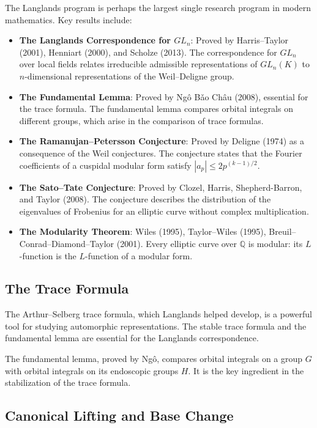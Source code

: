 The Langlands program is perhaps the largest single research program in modern mathematics. Key results include:
\begin{itemize}
\item \textbf{The Langlands Correspondence for $GL_n$}: Proved by Harris--Taylor (2001), Henniart (2000), and Scholze (2013). The correspondence for $GL_n$ over local fields relates irreducible admissible representations of $GL_n(K)$ to $n$-dimensional representations of the Weil--Deligne group.
\item \textbf{The Fundamental Lemma}: Proved by Ng\^o B\v{a}o Ch\^au (2008), essential for the trace formula. The fundamental lemma compares orbital integrals on different groups, which arise in the comparison of trace formulas.
\item \textbf{The Ramanujan--Petersson Conjecture}: Proved by Deligne (1974) as a consequence of the Weil conjectures. The conjecture states that the Fourier coefficients of a cuspidal modular form satisfy $|a_p| \leq 2p^{(k-1)/2}$.
\item \textbf{The Sato--Tate Conjecture}: Proved by Clozel, Harris, Shepherd-Barron, and Taylor (2008). The conjecture describes the distribution of the eigenvalues of Frobenius for an elliptic curve without complex multiplication.
\item \textbf{The Modularity Theorem}: Wiles (1995), Taylor--Wiles (1995), Breuil--Conrad--Diamond--Taylor (2001). Every elliptic curve over $\mathbb{Q}$ is modular: its $L$-function is the $L$-function of a modular form.
\end{itemize}

\subsection{The Trace Formula}

The Arthur--Selberg trace formula, which Langlands helped develop, is a powerful tool for studying automorphic representations. The stable trace formula and the fundamental lemma are essential for the Langlands correspondence.

The fundamental lemma, proved by Ng\^o, compares orbital integrals on a group $G$ with orbital integrals on its endoscopic groups $H$. It is the key ingredient in the stabilization of the trace formula.

\subsection{Canonical Lifting and Base Change}

